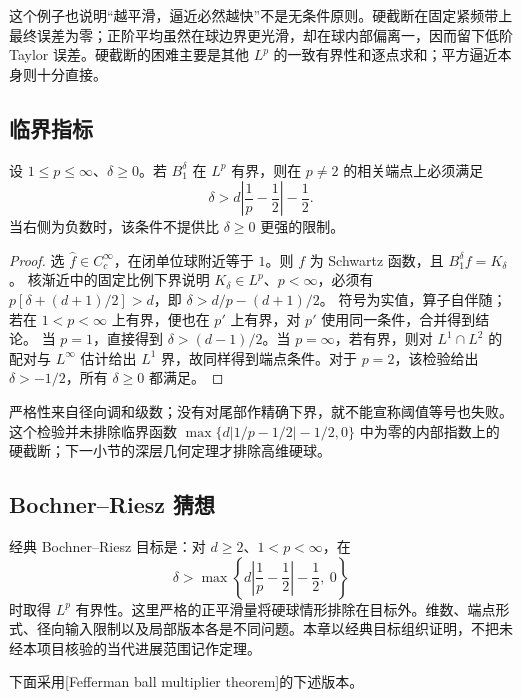 \ProseParagraphBreak

这个例子也说明“越平滑，逼近必然越快”不是无条件原则。硬截断在固定紧频带上最终误差为零；正阶平均虽然在球边界更光滑，却在球内部偏离一，因而留下低阶 Taylor 误差。硬截断的困难主要是其他 \(L^p\) 的一致有界性和逐点求和；平方逼近本身则十分直接。

\subsection{临界指标}
\label{b2:subsec:240302}

\begin{proposition}[尾部必要条件]\label{b2:prop:24-necessary}
设 \(1\le p\le\infty\)、\(\delta\ge0\)。若 \(B_1^\delta\) 在 \(L^p\) 有界，则在 \(p\ne2\) 的相关端点上必须满足
\[
 \delta>d\left|\frac1p-\frac12\right|-\frac12.
\]
当右侧为负数时，该条件不提供比 \(\delta\ge0\) 更强的限制。
\end{proposition}
\begin{proof}
选 \(\widehat f\in C_c^\infty\)，在闭单位球附近等于 \(1\)。则 \(f\) 为 Schwartz 函数，且 \(B_1^\delta f=K_\delta\)。
核渐近中的固定比例下界说明 \(K_\delta\in L^p\)、\(p<\infty\)，必须有
\(p[\delta+(d+1)/2]>d\)，即
\(\delta>d/p-(d+1)/2\)。
符号为实值，算子自伴随；若在 \(1<p<\infty\) 上有界，便也在 \(p'\) 上有界，对 \(p'\) 使用同一条件，合并得到结论。
当 \(p=1\)，直接得到 \(\delta>(d-1)/2\)。当 \(p=\infty\)，若有界，则对 \(L^1\cap L^2\) 的配对与 \(L^\infty\) 估计给出 \(L^1\) 界，故同样得到端点条件。对于 \(p=2\)，该检验给出 \(\delta>-1/2\)，所有 \(\delta\ge0\) 都满足。
\end{proof}
严格性来自径向调和级数；没有对尾部作精确下界，就不能宣称阈值等号也失败。这个检验并未排除临界函数
\(\max\{d|1/p-1/2|-1/2,0\}\) 中为零的内部指数上的硬截断；下一小节的深层几何定理才排除高维硬球。

\subsection{Bochner–Riesz 猜想}
\label{b2:subsec:240303}

经典 Bochner–Riesz 目标是：对 \(d\ge2\)、\(1<p<\infty\)，在
\[
 \delta>\max\left\{d\left|\frac1p-\frac12\right|-\frac12,\ 0\right\}
\]
时取得 \(L^p\) 有界性。这里严格的正平滑量将硬球情形排除在目标外。维数、端点形式、径向输入限制以及局部版本各是不同问题。本章以经典目标组织证明，不把未经本项目核验的当代进展范围记作定理。

\ProseParagraphBreak

下面采用[Fefferman ball multiplier theorem]的下述版本。

